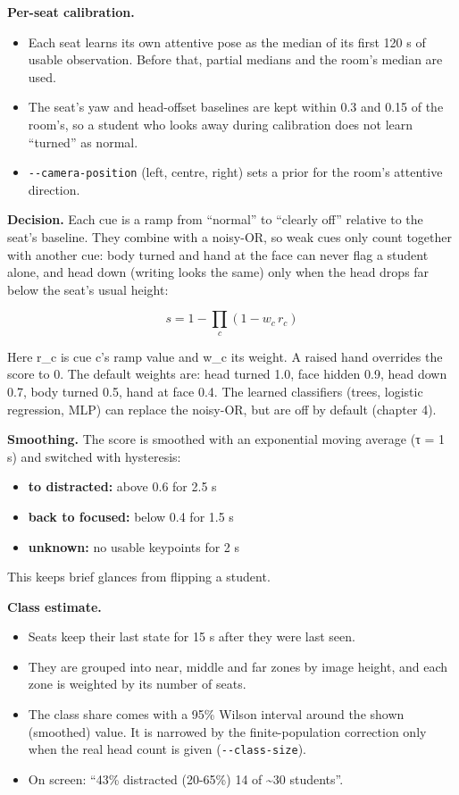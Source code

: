 \textbf{Per-seat calibration.}

\begin{itemize}
\tightlist
\item
  Each seat learns its own attentive pose as the median of its first 120 s of usable observation. Before that, partial medians and the room's median are used.
\item
  The seat's yaw and head-offset baselines are kept within 0.3 and 0.15 of the room's, so a student who looks away during calibration does not learn ``turned'' as normal.
\item
  \texttt{-\/-camera-position} (left, centre, right) sets a prior for the room's attentive direction.
\end{itemize}

\textbf{Decision.} Each cue is a ramp from ``normal'' to ``clearly off'' relative to the seat's baseline. They combine with a noisy-OR, so weak cues only count together with another cue: body turned and hand at the face can never flag a student alone, and head down (writing looks the same) only when the head drops far below the seat's usual height:

\begin{equation}
s = 1 - \prod_{c} \left(1 - w_c \, r_c\right)
\end{equation}

Here r\_c is cue c's ramp value and w\_c its weight. A raised hand overrides the score to 0. The default weights are: head turned 1.0, face hidden 0.9, head down 0.7, body turned 0.5, hand at face 0.4. The learned classifiers (trees, logistic regression, MLP) can replace the noisy-OR, but are off by default (chapter 4).

\textbf{Smoothing.} The score is smoothed with an exponential moving average (τ = 1 s) and switched with hysteresis:

\begin{itemize}
\tightlist
\item
  \textbf{to distracted:} above 0.6 for 2.5 s
\item
  \textbf{back to focused:} below 0.4 for 1.5 s
\item
  \textbf{unknown:} no usable keypoints for 2 s
\end{itemize}

This keeps brief glances from flipping a student.

\textbf{Class estimate.}

\begin{itemize}
\tightlist
\item
  Seats keep their last state for 15 s after they were last seen.
\item
  They are grouped into near, middle and far zones by image height, and each zone is weighted by its number of seats.
\item
  The class share comes with a 95\% Wilson interval \cite{b16} around the shown (smoothed) value. It is narrowed by the finite-population correction only when the real head count is given (\texttt{-\/-class-size}).
\item
  On screen: ``43\% distracted (20-65\%) \textbar{} 14 of \textasciitilde30 students''.
\end{itemize}

